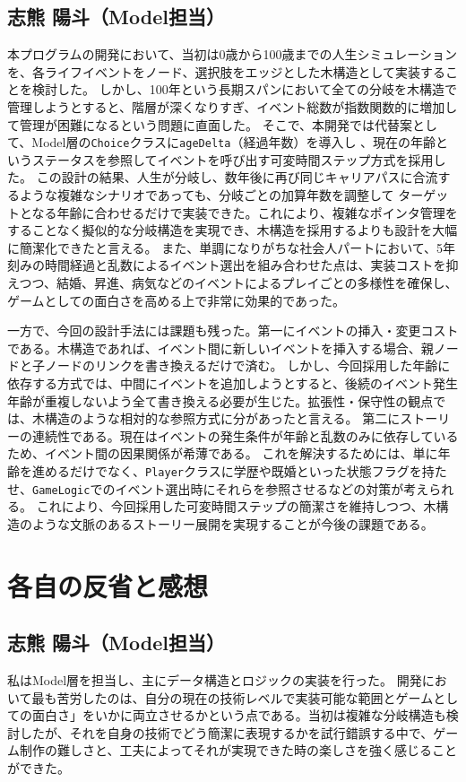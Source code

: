 \documentclass[a4paper,11pt]{jsarticle}
\begin{document}
\subsection{志熊 陽斗（Model担当）}
本プログラムの開発において、当初は0歳から100歳までの人生シミュレーションを、各ライフイベントをノード、選択肢をエッジとした木構造として実装することを検討した。
しかし、100年という長期スパンにおいて全ての分岐を木構造で管理しようとすると、階層が深くなりすぎ、イベント総数が指数関数的に増加して管理が困難になるという問題に直面した。
そこで、本開発では代替案として、Model層の\texttt{Choice}クラスに\texttt{ageDelta}（経過年数）を導入し
、現在の年齢というステータスを参照してイベントを呼び出す可変時間ステップ方式を採用した。
この設計の結果、人生が分岐し、数年後に再び同じキャリアパスに合流するような複雑なシナリオであっても、分岐ごとの加算年数を調整して
ターゲットとなる年齢に合わせるだけで実装できた。これにより、複雑なポインタ管理をすることなく擬似的な分岐構造を実現でき、木構造を採用するよりも設計を大幅に簡潔化できたと言える。
また、単調になりがちな社会人パートにおいて、5年刻みの時間経過と乱数によるイベント選出を組み合わせた点は、実装コストを抑えつつ、結婚、昇進、病気などのイベントによるプレイごとの多様性を確保し、
ゲームとしての面白さを高める上で非常に効果的であった。

一方で、今回の設計手法には課題も残った。第一にイベントの挿入・変更コストである。木構造であれば、イベント間に新しいイベントを挿入する場合、親ノードと子ノードのリンクを書き換えるだけで済む。
しかし、今回採用した年齢に依存する方式では、中間にイベントを追加しようとすると、後続のイベント発生年齢が重複しないよう全て書き換える必要が生じた。拡張性・保守性の観点では、木構造のような相対的な参照方式に分があったと言える。
第二にストーリーの連続性である。現在はイベントの発生条件が年齢と乱数のみに依存しているため、イベント間の因果関係が希薄である。
これを解決するためには、単に年齢を進めるだけでなく、\texttt{Player}クラスに学歴や既婚といった状態フラグを持たせ、\texttt{GameLogic}でのイベント選出時にそれらを参照させるなどの対策が考えられる。
これにより、今回採用した可変時間ステップの簡潔さを維持しつつ、木構造のような文脈のあるストーリー展開を実現することが今後の課題である。

\section{各自の反省と感想}

\subsection{志熊 陽斗（Model担当）}
私はModel層を担当し、主にデータ構造とロジックの実装を行った。
開発において最も苦労したのは、自分の現在の技術レベルで実装可能な範囲とゲームとしての面白さ」をいかに両立させるかという点である。当初は複雑な分岐構造も検討したが、それを自身の技術でどう簡潔に表現するかを試行錯誤する中で、ゲーム制作の難しさと、工夫によってそれが実現できた時の楽しさを強く感じることができた。
\end{document}
